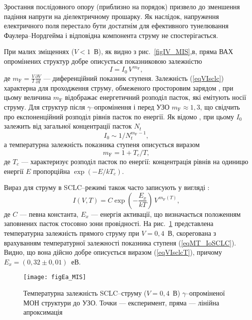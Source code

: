 Зростання послідовного опору (приблизно на порядок) призвело до зменшення падіння напруги на діелектричному прошарку.
Як наслідок, напруження електричного поля перестало бути достатнім для ефективного тунелювання Фаулера--Нордгейма і відповідна компонента струму не спостерігається.

При малих зміщеннях ($V<1$~В), як видно з рис.~\ref{figIV_MIS},в, пряма ВАХ опромінених структур добре описується показниковою залежністю
\begin{equation}\label{eqVIsclc}
  I=I_0\,V^{\,m_\mathrm{F}},
\end{equation}
де $m_\mathrm{F}=\frac{V}{I}\frac{\partial V}{\partial I}$ --- диференційний показник ступеня.
Залежність (\ref{eqVIsclc}) характерна для проходження струму, обмеженого просторовим зарядом \cite{SCLC:MA2016,Jafar,SCLC:Kaya}, при цьому величина $m_\mathrm{F}$ відображає енергетичний розподіл пасток, які емітують носії струму.
Для структур після $\gamma$--опромінення і перед УЗО $m_\mathrm{F}\approx1,3$, що свідчить про експоненційний розподіл рівнів пасток по енергії.
Як відомо \cite{SCLC:MA2016,Jafar,SCLC:Kaya}, при цьому $I_0$ залежить від загальної концентрації пасток $N_t$
\begin{equation}\label{eqIoSCLC}
  I_0\sim 1/N_t^{m_\mathrm{F}-1},
\end{equation}
а температурна залежність показника ступеня описується виразом
\begin{equation}\label{eqMT_IoSCLC}
  m_\mathrm{F}=1+T_c/T,
\end{equation}
де
$T_c$ --- характеризує розподіл пасток по енергії:
концентрація рівнів на одиницю енергії $E$ пропорційна $\exp(-E/kT_c)$.

Вираз для струму в SCLC--режимі також часто записують у вигляді \cite{Jafar}:
\begin{equation}\label{eqVIsclcT}
  I(V,T)=C\exp\left(-\frac{E_x}{kT}\right)\,V^{\,m_\mathrm{F}(T)},
\end{equation}
де
$C$ --- певна константа,
$E_x$ --- енергія активації, що визначається положенням заповнених пасток стосовно зони провідності.
На рис.~\ref{figEa_MIS} представлена температурна залежність прямого струму при $V=0,4$~В, скорегована з врахуванням
температурної залежності показника ступеня (\ref{eqMT_IoSCLC}).
Видно, що вона дійсно добре описується виразом (\ref{eqVIsclcT}), причому $E_x=(0,32\pm0,01)$~еВ.

\begin{figure}
\center
\texttt{[image: figEa\_MIS]}%
\caption{\label{figEa_MIS}
Температурна залежність SCLC--струму ($V=0,4$~В)
$\gamma$--опроміненої МОН структури
до УЗО.
Точки --- експеримент,
пряма --- лінійна апроксимація
}%
\end{figure}

